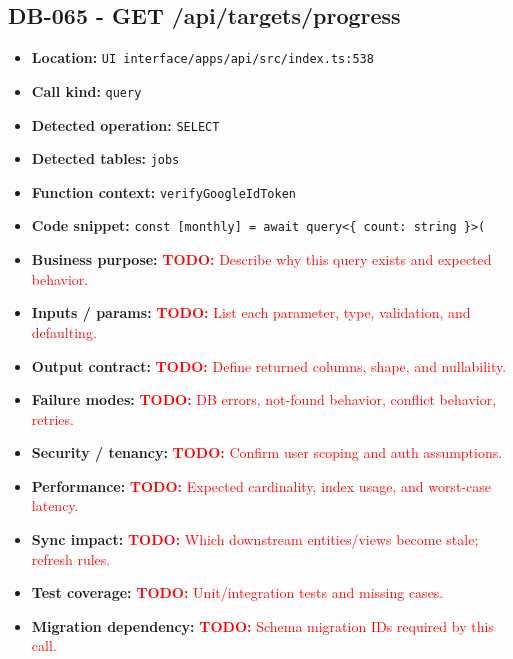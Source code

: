 \documentclass[11pt]{article}
\newcommand{\todoitem}[1]{\textcolor{red}{\textbf{TODO:} #1}}
\begin{document}
\subsection{DB-065 - GET /api/targets/progress}
\begin{itemize}[leftmargin=1.5em]
\item \textbf{Location:} \texttt{UI interface/apps/api/src/index.ts:538}
\item \textbf{Call kind:} \texttt{query}
\item \textbf{Detected operation:} \texttt{SELECT}
\item \textbf{Detected tables:} \texttt{jobs}
\item \textbf{Function context:} \texttt{verifyGoogleIdToken}
\item \textbf{Code snippet:} \texttt{const [monthly] = await query<\{ count: string \}>(}
\item \textbf{Business purpose:} \todoitem{Describe why this query exists and expected behavior.}
\item \textbf{Inputs / params:} \todoitem{List each parameter, type, validation, and defaulting.}
\item \textbf{Output contract:} \todoitem{Define returned columns, shape, and nullability.}
\item \textbf{Failure modes:} \todoitem{DB errors, not-found behavior, conflict behavior, retries.}
\item \textbf{Security / tenancy:} \todoitem{Confirm user scoping and auth assumptions.}
\item \textbf{Performance:} \todoitem{Expected cardinality, index usage, and worst-case latency.}
\item \textbf{Sync impact:} \todoitem{Which downstream entities/views become stale; refresh rules.}
\item \textbf{Test coverage:} \todoitem{Unit/integration tests and missing cases.}
\item \textbf{Migration dependency:} \todoitem{Schema migration IDs required by this call.}
\end{itemize}
\end{document}
